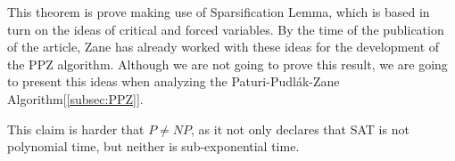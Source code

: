 This theorem is prove making use of Sparsification Lemma, which is based in turn on the ideas of critical and forced variables. By the time of the publication of the article, Zane has already worked with these ideas for the development of the PPZ algorithm\cite{paturi1997satisfiability}. Although we are not going to prove this result, we are going to present this ideas when analyzing the Paturi-Pudlák-Zane Algorithm[\ref{subsec:PPZ}].
 
This claim is harder that $P\ne NP$, as it not only declares that SAT is not polynomial time, but neither is sub-exponential time. 







